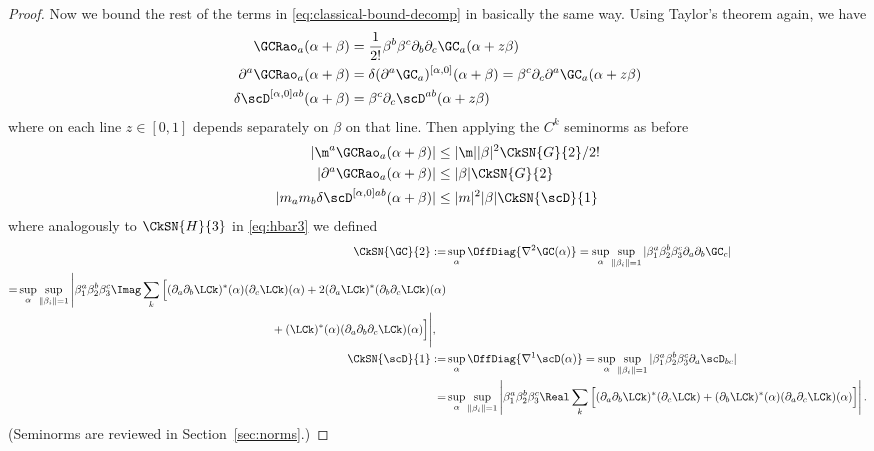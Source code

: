 \documentclass{article}
\numberwithin{equation}{section}
\begin{document}
\begin{proof}
Now we bound the rest of the terms in \eqref{eq:classical-bound-decomp} in basically the same way. Using Taylor's theorem again, we have
\begin{align}\begin{split}
		\GCRao_{a}(\alpha+\beta) &= \frac{1}{2!}\beta^b\beta^c\partial_b\partial_c \GC_{a}(\alpha+z\beta)\\
		\partial^a \GCRao_{a}(\alpha+\beta) &= \delta(\partial^a \GC_{a})^{[\alpha,0]}(\alpha+\beta) = \beta^c  \partial_c \partial^a \GC_{a}(\alpha+z\beta)\\
		\delta\scD^{[\alpha,0]ab}(\alpha+\beta) &= \beta^c\partial_c \scD^{ab}(\alpha+z\beta)
\end{split}\end{align}
where on each line $z\in[0,1]$ depends separately on $\beta$ on that line. 
Then applying the $C^k$ seminorms as before
\begin{align}\begin{split}
		|\m^a \GCRao_{a} (\alpha+\beta)| &\le
		|\m| |\beta|^2 \CkSN{G}{2}/2!
		\\
		|\partial^a \GCRao_{a}(\alpha+\beta) | &\le
		|\beta| \CkSN{G}{2}
		\\
		|m_a m_b \delta\scD^{[\alpha,0]ab} (\alpha+\beta)| &\le
		|m|^2 |\beta| \CkSN{\scD}{1}
\end{split}\end{align}
where
analogously to $\CkSN{H}{3}$ in \eqref{eq:hbar3} we defined
\begin{align}\label{eq:gbar-deltabar}
	\CkSN{\GC}{2}
	:=& \sup_\alpha \OffDiag{\nabla^2 \GC(\alpha)} = \sup_\alpha \sup_{\|\beta_i\|=1}  |\beta_1^a \beta_2^b\beta_3^c \partial_a \partial_b \GC_c|\\
	\label{eq:wbar-expanded}
    \begin{split}
	=& 
    \sup_\alpha \sup_{\|\beta_i\|=1}
    \Bigg|\beta_1^a \beta_2^b\beta_3^c\Imag \sum_k \Big[(\partial_{a} \partial_{b} \LCk)^*(\alpha)(\partial_{c} \LCk)(\alpha)+2(\partial_{a} \LCk)^*(\partial_{b} \partial_{c} \LCk)(\alpha)
    \\
    &\hspace{22em}
    +(\LCk)^*(\alpha)(\partial_{a}\partial_{b} \partial_{c} \LCk)(\alpha)\Big]\Bigg|, 
    \end{split}
    \\
	\CkSN{\scD}{1}
    :=& \sup_\alpha \OffDiag{\nabla^1 \scD(\alpha)} = \sup_\alpha \sup_{\|\beta_i\|=1}  |\beta_1^a \beta_2^b\beta_3^c \partial_a \scD_{bc}|\\
    =&  \sup_\alpha \sup_{\|\beta_i\|=1} \left|\beta_1^a \beta_2^b\beta_3^c \Real \sum_k \Big[(\partial_{a} \partial_{b} \LCk)^*(\partial_{c} \LCk)+(\partial_{b} \LCk)^*(\alpha)(\partial_{a} \partial_{c} \LCk)(\alpha)\Big]\right|.
\end{align}
(Seminorms are reviewed in Section~\ref{sec:norms}.)


\end{proof}
\end{document}
